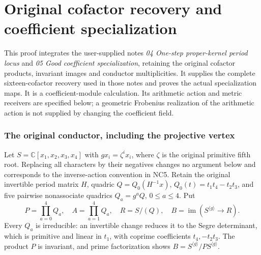\documentclass[11pt]{article}
\begin{document}
\endgroup

\clearpage\begingroup
\part*{Original cofactor recovery and coefficient specialization}
\newcommand{\pcofactorC}{\mathbb C}
\newcommand{\pcofactorim}{\operatorname{im}}
\newcommand{\pcofactorSpec}{\operatorname{Spec}}
\newcommand{\pcofactordiag}{\operatorname{diag}}


This proof integrates the user-supplied notes
\emph{04 One-step proper-kernel period locus} and
\emph{05 Good coefficient specialization}, retaining the original
cofactor products, invariant images and conductor multiplicities.
It supplies the complete sixteen-cofactor recovery used in those notes
and proves the actual specialization maps. It is a coefficient-module
calculation. Its arithmetic action and metric receivers are specified
below; a geometric Frobenius realization of the arithmetic action is
not supplied by changing the coefficient field.

\section{The original conductor, including the projective vertex}
Let $S=\pcofactorC[x_1,x_2,x_3,x_4]$ with
$g x_i=\zeta^i x_i$, where $\zeta$ is the original primitive fifth
root. Replacing all characters by their negatives changes no argument
below and corresponds to the inverse-action convention in NC5.
Retain the original invertible period matrix $H$, quadric
$Q=Q_0(H^{-1}x)$, $Q_0(t)=t_1t_4-t_2t_3$, and five pairwise
nonassociate quadrics $Q_a=g^aQ$, $0\le a\le4$. Put
\[
 P=\prod_{a=0}^4Q_a,\quad A=\prod_{a=1}^4Q_a,\quad
 R=S/(Q),\quad B=\pcofactorim(S^{\langle g\rangle}\to R).
                                                                    \tag{CP1}
\]
Every $Q_a$ is irreducible: an invertible change reduces it to the
Segre determinant, which is primitive and linear in $t_1$, with
coprime coefficients $t_4,-t_2t_3$. The product $P$ is invariant,
and prime factorization shows
$B=S^{\langle g\rangle}/P S^{\langle g\rangle}$.
\end{document}
